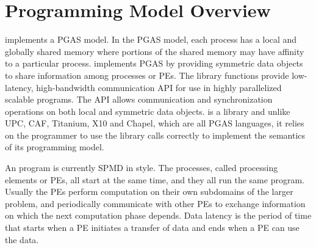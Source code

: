 \section{Programming Model Overview}

\openshmem implements a \ac{PGAS} model. In the \ac{PGAS} model, each process has a local and 
globally shared memory where portions of the shared memory may have affinity to a particular process. 
\openshmem implements \ac{PGAS} by providing symmetric data objects to share information among processes or \ac{PE}s. 
The \openshmem  library functions provide low-latency, high-bandwidth communication \ac{API} for  use  in  highly  parallelized 
scalable programs. The \ac{API} allows communication and synchronization operations on both local and symmetric data objects. 
\openshmem is a library and unlike UPC, CAF, Titanium, X10 and Chapel, which are all
PGAS languages, it relies on the programmer to use the library calls correctly to implement the semantics of its programming model.

An \openshmem program is currently \ac{SPMD} in style. The
\openshmem  processes,  called  processing elements or \ac{PE}s, all start at the
same time, and they all run the same program.  Usually the \ac{PE}s  perform
computation on their own subdomains of the larger problem, and periodically 
communicate with other \ac{PE}s to exchange information on which the
next computation phase depends.
Data latency is  the  period  of  time that starts when a \ac{PE} initiates a transfer of data 
and ends when a \ac{PE} can use the data.


